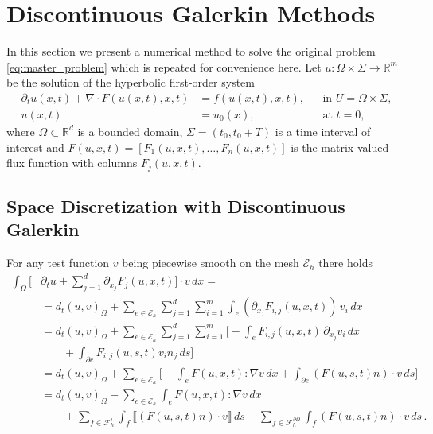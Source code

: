 \documentclass[a4paper,12pt]{article}
\theoremstyle{definition}
\theoremstyle{definition}
\newcommand{\Dim}{d}
\begin{document}
\section{Discontinuous Galerkin Methods}

In this section we present a numerical method to solve the original
problem \eqref{eq:master_problem} which is repeated for convenience here.
Let $u: \Omega\times\Sigma\to\mathbb{R}^m$ be the solution of the
hyperbolic first-order system
\begin{subequations}
	\label{eq:master_problem_repeated}
	\begin{align}
	\partial_t u(x,t) + \nabla\cdot F(u(x,t),x,t) &= f(u(x,t),x,t), &&\text{in $U=\Omega\times\Sigma$}, \\
	u(x,t) &= u_0(x), &&\text{at $t=0$},
	\end{align}
\end{subequations}
where $\Omega\subset\mathbb{R}^{\Dim}$ is a bounded domain, $\Sigma=(t_0,t_0+T)$
is a time interval of interest and $F(u,x,t)=[F_1(u,x,t),\ldots,F_n(u,x,t)]$ is the
matrix valued flux function with columns $F_j(u,x,t)$.

\subsection{Space Discretization with Discontinuous Galerkin}

For any test function $v$ being piecewise smooth
on the mesh $\mathcal{E}_h$ there holds
\begin{equation}\label{eq:DG_identity}
\begin{split}
\int_\Omega \biggl[&\partial_t u + \sum_{j=1}^{\Dim}\partial_{x_j}F_j(u,x,t)\biggr]\cdot v \,dx = \\
&= d_t (u,v)_\Omega + \sum_{e\in\mathcal{E}_h} \sum_{j=1}^{\Dim} \sum_{i=1}^m
\int_e (\partial_{x_j}F_{i,j}(u,x,t)) \, v_i \,dx \\
&= d_t (u,v)_\Omega + \sum_{e\in\mathcal{E}_h} \sum_{j=1}^{\Dim} \sum_{i=1}^m
\biggl[ - \int_e F_{i,j}(u,x,t) \,\partial_{x_j} v_i \,dx \\
&\qquad+ \int_{\partial e} F_{i,j}(u,s,t) v_i n_j\,ds \biggr]\\
&= d_t (u,v)_\Omega + \sum_{e\in\mathcal{E}_h}  \biggl[-\int_e F(u,x,t) : \nabla v\,dx
+ \int_{\partial e} (F(u,s,t)n)\cdot v\,ds\biggr]\\
&= d_t (u,v)_\Omega - \sum_{e\in\mathcal{E}_h} \int_e F(u,x,t) : \nabla v\,dx\\
&\qquad + \sum_{f\in\mathcal{F}_h^i} \int_f \llbracket (F(u,s,t)n)\cdot v \rrbracket \,ds
+ \sum_{f\in\mathcal{F}_h^{\partial\Omega}} \int_f (F(u,s,t)n)\cdot v \,ds \,.
\end{split}
\end{equation}
\end{document}

